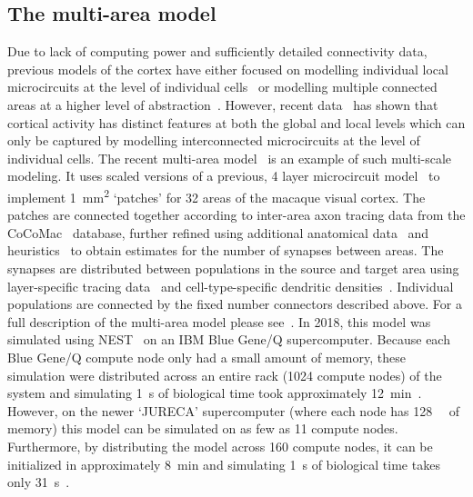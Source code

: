 \documentclass[9pt,a4paper]{amsart}
\begin{document}
\subsection{The multi-area model}
Due to lack of computing power and sufficiently detailed connectivity data, previous models of the cortex have either focused on modelling individual local microcircuits at the level of individual cells~\citep{Izhikevich2008,Potjans2012} or modelling multiple connected areas at a higher level of abstraction~\citep{Cabral2014}.
However, recent data~\citep{Belitski2008} has shown that cortical activity has distinct features at both the global and local levels which can only be captured by modelling interconnected microcircuits at the level of individual cells.
The recent multi-area model~\citep{Schmidt2018a,Schmidt2018} is an example of such multi-scale modeling.
It uses scaled versions of a previous, 4 layer microcircuit model~\citep{Potjans2012} to implement \SI{1}{\milli\meter\squared} `patches' for 32 areas of the macaque visual cortex.
The patches are connected together according to inter-area axon tracing data from the CoCoMac~\citep{Bakker2012} database, further refined using additional anatomical data~\citep{Markov2014} and heuristics~\citep{Ercsey-Ravasz2013} to obtain estimates for the number of synapses between areas.
The synapses are distributed between populations in the source and target area using layer-specific tracing data~\citep{Markov2014b} and cell-type-specific dendritic densities~\citep{Binzegger2004}.
Individual populations are connected by the fixed number connectors described above.
For a full description of the multi-area model please see~\citet{Schmidt2018a,Schmidt2018}.
In 2018, this model was simulated using NEST~\citep{Gewaltig2007} on an IBM Blue Gene/Q supercomputer.
Because each Blue Gene/Q compute node only had a small amount of memory, these simulation were distributed across an entire rack (\num{1024} compute nodes) of the system and simulating \SI{1}{\second} of biological time took approximately \SI{12}{\minute}~\citep{Schmidt2018}.
However, on the newer `JURECA' supercomputer (where each node has \SI{128}{\giga\byte} of memory) this model can be simulated on as few as \num{11} compute nodes.
Furthermore, by distributing the model across \num{160} compute nodes, it can be initialized in approximately \SI{8}{\minute} and simulating \SI{1}{\second} of biological time takes only \SI{31}{\second}~\citep{VanAlbada2020}.
\end{document}
